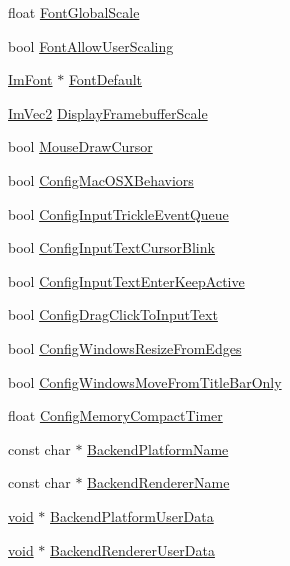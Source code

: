 \begin{DoxyCompactItemize}
float \hyperlink{structImGuiIO_a74a64a74dcbe2a6ef0c1ef56ba328094}{Font\+Global\+Scale}
\item 
bool \hyperlink{structImGuiIO_af5fc6eae7ce68cce8473f006431f530e}{Font\+Allow\+User\+Scaling}
\item 
\hyperlink{structImFont}{Im\+Font} $\ast$ \hyperlink{structImGuiIO_a11016e4aefa603523bce61315b66bf00}{Font\+Default}
\item 
\hyperlink{structImVec2}{Im\+Vec2} \hyperlink{structImGuiIO_a703cad6bd4c9e8972d056116104d27e8}{Display\+Framebuffer\+Scale}
\item 
bool \hyperlink{structImGuiIO_a9b240460966bf2bd35c30f27b8db4028}{Mouse\+Draw\+Cursor}
\item 
bool \hyperlink{structImGuiIO_ab2b62c3ee538d4037e7467bf934fd7a2}{Config\+Mac\+O\+S\+X\+Behaviors}
\item 
bool \hyperlink{structImGuiIO_af38a4c1ec57a1721dc1bbf81ccc16dc7}{Config\+Input\+Trickle\+Event\+Queue}
\item 
bool \hyperlink{structImGuiIO_ad17e398044a43d0020f692af8a72a9ac}{Config\+Input\+Text\+Cursor\+Blink}
\item 
bool \hyperlink{structImGuiIO_abdd7e183fe87d70c779c2d28ee63eb4d}{Config\+Input\+Text\+Enter\+Keep\+Active}
\item 
bool \hyperlink{structImGuiIO_a8ecd103855fbd0bb9090d5998bc994bc}{Config\+Drag\+Click\+To\+Input\+Text}
\item 
bool \hyperlink{structImGuiIO_aaa627c27ae9e957f738e74a67629bed6}{Config\+Windows\+Resize\+From\+Edges}
\item 
bool \hyperlink{structImGuiIO_a17f4703e015c69263170396441b321d9}{Config\+Windows\+Move\+From\+Title\+Bar\+Only}
\item 
float \hyperlink{structImGuiIO_aedd3ba8bfc9c682e5a7a66ffdd480df2}{Config\+Memory\+Compact\+Timer}
\item 
const char $\ast$ \hyperlink{structImGuiIO_a58510e764707bf979d086f6bc4c8b670}{Backend\+Platform\+Name}
\item 
const char $\ast$ \hyperlink{structImGuiIO_ad0902d7c892cff675fc0a685e8f1481d}{Backend\+Renderer\+Name}
\item 
\hyperlink{imgui__impl__opengl3__loader_8h_ac668e7cffd9e2e9cfee428b9b2f34fa7}{void} $\ast$ \hyperlink{structImGuiIO_a6c0c878d0d5ca6ef90f0968bd59309d3}{Backend\+Platform\+User\+Data}
\item 
\hyperlink{imgui__impl__opengl3__loader_8h_ac668e7cffd9e2e9cfee428b9b2f34fa7}{void} $\ast$ \hyperlink{structImGuiIO_a9d1b2553e914286e9f92ab62f3d38265}{Backend\+Renderer\+User\+Data}

\end{DoxyCompactItemize}
